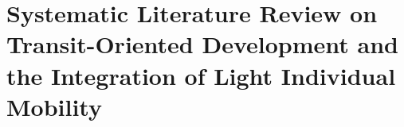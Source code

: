 
\chapter
{Systematic Literature Review on Transit-Oriented Development and the Integration of Light Individual Mobility
    \label{chap2:titre}
    }
    \begin{refsegment}



\end{refsegment}
